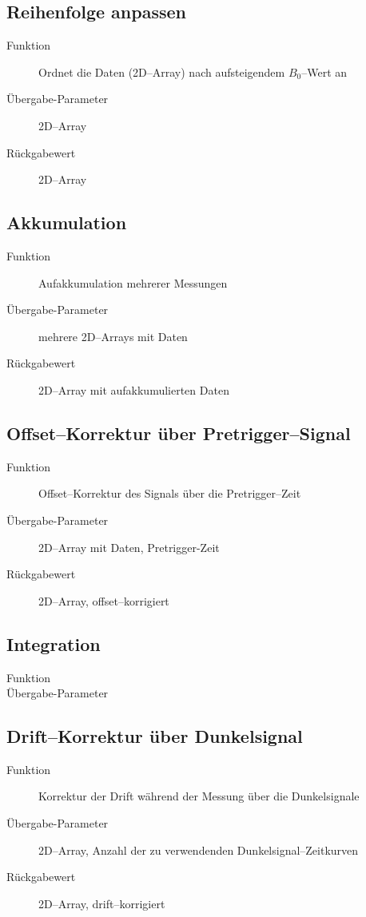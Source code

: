 \documentclass{article}
\begin{document}
\subsection{Reihenfolge anpassen}

\begin{description}
  \item[Funktion] Ordnet die Daten (2D--Array) nach aufsteigendem $B_0$--Wert an
  \item[Übergabe-Parameter] 2D--Array
  \item[Rückgabewert] 2D--Array
\end{description}


\subsection{Akkumulation}

\begin{description}
  \item[Funktion] Aufakkumulation mehrerer Messungen
  \item[Übergabe-Parameter] mehrere 2D--Arrays mit Daten
  \item[Rückgabewert] 2D--Array mit aufakkumulierten Daten
\end{description}


\subsection{Offset--Korrektur über Pretrigger--Signal}

\begin{description}
  \item[Funktion] Offset--Korrektur des Signals über die Pretrigger--Zeit
  \item[Übergabe-Parameter] 2D--Array mit Daten, Pretrigger-Zeit
  \item[Rückgabewert] 2D--Array, offset--korrigiert
\end{description}


\subsection{Integration}

\begin{description}
  \item[Funktion]
  \item[Übergabe-Parameter] 
\end{description}


\subsection{Drift--Korrektur über Dunkelsignal}

\begin{description}
  \item[Funktion] Korrektur der Drift während der Messung über die Dunkelsignale
  \item[Übergabe-Parameter] 2D--Array, Anzahl der zu verwendenden 
  Dunkelsignal--Zeitkurven
  \item[Rückgabewert] 2D--Array, drift--korrigiert
\end{description}
\end{document}
